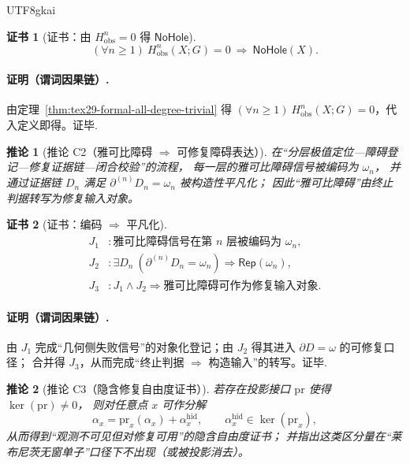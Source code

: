 \documentclass[12pt]{article}
\newtheorem{corollary}{推论}[section]
\newtheorem{Certificate}{证书}[section]
\newcommand{\KouJing}{\texorpdfstring{表述约定}{表述约定}}
\begin{document}
\begin{CJK*}{UTF8}{gkai}
\begin{Certificate}[证书：由 $H^n_{\mathrm{obs}}=0$ 得 $\mathsf{NoHole}$]
\[
  (\forall n\ge 1)\ H^n_{\mathrm{obs}}(X;G)=0\ \Rightarrow\ \mathsf{NoHole}(X).
\]
\end{Certificate}

\paragraph{证明（谓词因果链）.}
由定理~\ref{thm:tex29-formal-all-degree-trivial} 得 $(\forall n\ge 1)\ H^n_{\mathrm{obs}}(X;G)=0$，代入定义即得。证毕.

\begin{corollary}[推论 C2（雅可比障碍 $\Rightarrow$ 可修复障碍表达）]
\label{cor:tex29-formal-jacobi-to-rep}
在“分层极值定位—障碍登记—修复证据链—闭合校验”的流程，
每一层的雅可比障碍信号被编码为 $\omega_n$，
并通过证据链 $D_n$ 满足 $\partial^{(n)}D_n=\omega_n$ 被构造性平凡化；
因此“雅可比障碍”由终止判据转写为修复输入对象。
\end{corollary}

\begin{Certificate}[证书：编码 $\Rightarrow$ 平凡化]
\[
\begin{aligned}
  J_1 &: \text{雅可比障碍信号在第 }n\text{ 层被编码为 }\omega_n,\\
  J_2 &: \exists D_n\ (\partial^{(n)}D_n=\omega_n)\Rightarrow \mathsf{Rep}(\omega_n),\\
  J_3 &: J_1\wedge J_2\Rightarrow \text{雅可比障碍可作为修复输入对象}.
\end{aligned}
\]
\end{Certificate}

\paragraph{证明（谓词因果链）.}
由 $J_1$ 完成“几何侧失败信号”的对象化登记；由 $J_2$ 得其进入 $\partial D=\omega$ 的可修复口径；
合并得 $J_3$，从而完成“终止判据 $\Rightarrow$ 构造输入”的转写。证毕.

\begin{corollary}[推论 C3（隐含修复自由度证书）]
\label{cor:tex29-formal-hidden-dof}
若存在投影接口 $\mathrm{pr}$ 使得 $\ker(\mathrm{pr})\neq 0$，
则对任意点 $x$ 可作分解
\[
  \alpha_x=\mathrm{pr}_x(\alpha_x)+\alpha_x^{\mathrm{hid}},\qquad \alpha_x^{\mathrm{hid}}\in\ker(\mathrm{pr}_x),
\]
从而得到“观测不可见但对修复可用”的隐含自由度证书；
并指出这类区分量在“莱布尼茨无窗单子”口径下不出现（或被投影消去）。
\end{corollary}


\end{CJK*}
\end{document}
